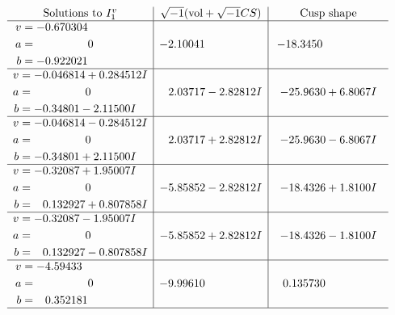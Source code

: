 \documentclass[1p]{elsarticle_modified}
\theoremstyle{definition}
\newcommand{\I}{\sqrt{-1}}
\begin{document}
$$\begin{array}{c|c|c}  
\text{Solutions to }I^v_{1}& \I (\text{vol} + \sqrt{-1}CS) & \text{Cusp shape}\\
 \hline 
\begin{aligned}
v &= -0.670304\phantom{ +0.000000I} \\
a &= \phantom{-0.000000 } 0 \\
b &= -0.922021\phantom{ +0.000000I}\end{aligned}
 & -2.10041\phantom{ +0.000000I} & -18.3450\phantom{ +0.000000I} \\ \hline\begin{aligned}
v &= -0.046814 + 0.284512 I \\
a &= \phantom{-0.000000 } 0 \\
b &= -0.34801 - 2.11500 I\end{aligned}
 & \phantom{-}2.03717 - 2.82812 I & -25.9630 + 6.8067 I \\ \hline\begin{aligned}
v &= -0.046814 - 0.284512 I \\
a &= \phantom{-0.000000 } 0 \\
b &= -0.34801 + 2.11500 I\end{aligned}
 & \phantom{-}2.03717 + 2.82812 I & -25.9630 - 6.8067 I \\ \hline\begin{aligned}
v &= -0.32087 + 1.95007 I \\
a &= \phantom{-0.000000 } 0 \\
b &= \phantom{-}0.132927 + 0.807858 I\end{aligned}
 & -5.85852 - 2.82812 I & -18.4326 + 1.8100 I \\ \hline\begin{aligned}
v &= -0.32087 - 1.95007 I \\
a &= \phantom{-0.000000 } 0 \\
b &= \phantom{-}0.132927 - 0.807858 I\end{aligned}
 & -5.85852 + 2.82812 I & -18.4326 - 1.8100 I \\ \hline\begin{aligned}
v &= -4.59433\phantom{ +0.000000I} \\
a &= \phantom{-0.000000 } 0 \\
b &= \phantom{-}0.352181\phantom{ +0.000000I}\end{aligned}
 & -9.99610\phantom{ +0.000000I} & \phantom{-}0.135730\phantom{ +0.000000I}\\
 \hline 
 \end{array}$$\newpage
\end{document}
